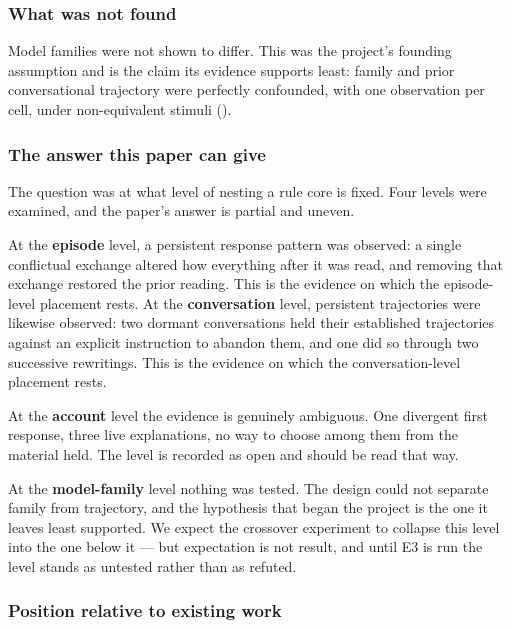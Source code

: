 \subsubsection*{What was not found}
\label{sec:en:x-what-was-not-found}

Model families were not shown to differ. This was the project's founding assumption and is the claim its evidence supports least: family and prior conversational trajectory were perfectly confounded, with one observation per cell, under non-equivalent stimuli ().


\subsubsection*{The answer this paper can give}
\label{sec:en:x-the-answer-this-paper-can-give}

The question was at what level of nesting a rule core is fixed. Four levels were examined, and the paper's answer is partial and uneven.

At the \textbf{episode} level, a persistent response pattern was observed: a single conflictual exchange altered how everything after it was read, and removing that exchange restored the prior reading. This is the evidence on which the episode-level placement rests. At the \textbf{conversation} level, persistent trajectories were likewise observed: two dormant conversations held their established trajectories against an explicit instruction to abandon them, and one did so through two successive rewritings. This is the evidence on which the conversation-level placement rests.

At the \textbf{account} level the evidence is genuinely ambiguous. One divergent first response, three live explanations, no way to choose among them from the material held. The level is recorded as open and should be read that way.

At the \textbf{model-family} level nothing was tested. The design could not separate family from trajectory, and the hypothesis that began the project is the one it leaves least supported. We expect the crossover experiment to collapse this level into the one below it — but expectation is not result, and until E3 is run the level stands as untested rather than as refuted.


\subsubsection*{Position relative to existing work}
\label{sec:en:x-position-relative-to-existing-work}

